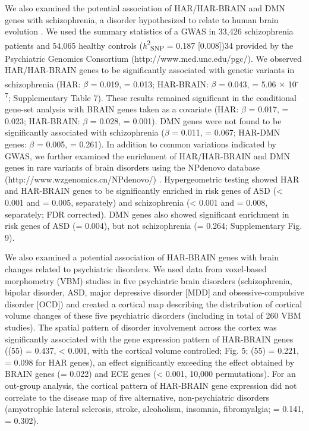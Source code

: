 \begin{refsection}
We also examined the potential association of HAR/HAR-BRAIN and DMN genes with schizophrenia, a disorder hypothesized to relate to human brain evolution \citep{crow1997schizophrenia,Heuvel2019EvolutionaryMI}. We used the summary statistics of a GWAS in 33,426 schizophrenia patients and 54,065 healthy controls (\textit{h}\textsuperscript{2}\textsubscript{SNP} = 0.187 [0.008])34 provided by the Psychiatric Genomics Consortium (http://www.med.unc.edu/pgc/). We observed HAR/HAR-BRAIN genes to be significantly associated with genetic variants in schizophrenia (HAR: $\beta$ = 0.019, \pval = 0.013; HAR-BRAIN: $\beta$ = 0.043, \pval = 5.06 $\times$ 10\textsuperscript{-7}; Supplementary Table 7). These results remained significant in the conditional gene-set analysis with BRAIN genes taken as a covariate (HAR: $\beta$ = 0.017, \pval = 0.023; HAR-BRAIN: $\beta$ = 0.028, \pval = 0.001). DMN genes were not found to be significantly associated with schizophrenia ($\beta$ = 0.011, \pval = 0.067; HAR-DMN genes: $\beta$ = 0.005, \pval = 0.261). In addition to common variations indicated by GWAS, we further examined the enrichment of HAR/HAR-BRAIN and DMN genes in rare variants of brain disorders using the NPdenovo database (http://www.wzgenomics.cn/NPdenovo/) \citep{li2016genes}. Hypergeometric testing showed HAR and HAR-BRAIN genes to be significantly enriched in risk genes of ASD (\pval  < 0.001 and \pval = 0.005, separately) and schizophrenia (\pval < 0.001 and \pval = 0.008, separately; FDR corrected). DMN genes also showed significant enrichment in risk genes of ASD (\pval = 0.004), but not schizophrenia (\pval = 0.264; Supplementary Fig. 9).

We also examined a potential association of HAR-BRAIN genes with brain changes related to psychiatric disorders. We used data from voxel-based morphometry (VBM) studies in five psychiatric brain disorders (schizophrenia, bipolar disorder, ASD, major depressive disorder [MDD] and obsessive-compulsive disorder [OCD]) and created a cortical map describing the distribution of cortical volume changes of these five psychiatric disorders (including in total of 260 VBM studies). The spatial pattern of disorder involvement across the cortex was significantly associated with the gene expression pattern of HAR-BRAIN genes (\rvaldf(55) = 0.437, \pval < 0.001, with the cortical volume controlled; Fig. 5; \rvaldf(55) = 0.221, \pval = 0.098 for HAR genes), an effect significantly exceeding the effect obtained by BRAIN genes (\pval = 0.022) and ECE genes (\pval < 0.001, 10,000 permutations). For an out-group analysis, the cortical pattern of HAR-BRAIN gene expression did not correlate to the disease map of five alternative, non-psychiatric disorders (amyotrophic lateral sclerosis, stroke, alcoholism, insomnia, fibromyalgia; \rvaldf = 0.141, \pval = 0.302).


\end{refsection}
